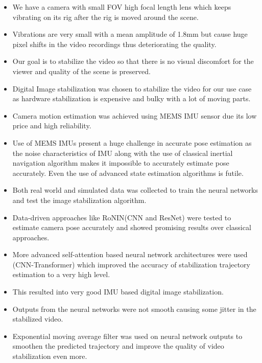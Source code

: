 \begin{itemize}
    \item We have a camera with small FOV high focal length lens which keeps vibrating on its rig after the rig is moved around the scene.

    \item Vibrations are very small with a mean amplitude of 1.8mm but cause huge pixel shifts in the video recordings thus deteriorating the quality.

    \item Our goal is to stabilize the video so that there is no visual discomfort for the viewer and quality of the scene is preserved.
    
    \item Digital Image stabilization was chosen to stabilize the video for our use case as hardware stabilization is expensive and bulky with a lot of moving parts.

    \item Camera motion estimation was achieved using MEMS IMU sensor due its low price and high reliability.

    \item Use of MEMS IMUs present a huge challenge in accurate pose estimation as the noise characteristics of IMU along with the use of classical inertial navigation algorithm makes it impossible to accurately estimate pose accurately. Even the use of advanced state estimation algorithms is futile.

    \item Both real world and simulated data was collected to train the neural networks and test the image stabilization algorithm.

    \item Data-driven approaches like RoNIN(CNN and ResNet) were tested to estimate camera pose accurately and showed promising results over classical approaches.

    \item More advanced self-attention based neural network architectures were used (CNN-Transformer) which improved the accuracy of stabilization trajectory estimation to a very high level.

    \item This resulted into very good IMU based digital image stabilization.

    \item Outputs from the neural networks were not smooth causing some jitter in the stabilized video.

    \item Exponential moving average filter was used on neural network outputs to smoothen the predicted trajectory and improve the quality of video stabilization even more.

\end{itemize}


